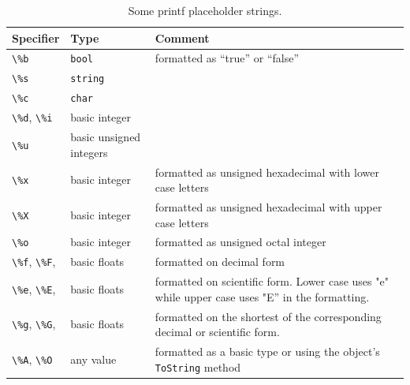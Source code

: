 \documentclass[fsharpnotes.tex]{subfiles}
\begin{document}
\begin{table}[H]
  \centering
  \begin{tabularx}{\linewidth}{|l|l|X|}
    \hline
    \rowcolor{headerRowColor} Specifier& Type&Comment\\
    \hline
    \lstinline!\%b!&\lstinline!bool!&formatted as ``true'' or ``false''\\
    \hline
    \lstinline!\%s!&\lstinline!string!&\\
    \hline
    \lstinline!\%c!&\lstinline!char!&\\
    \hline
    \mbox{\lstinline!\%d!,} \mbox{\lstinline!\%i!}&basic integer&\\
    \hline
    \lstinline!\%u!&basic unsigned integers&\\
    \hline
    \lstinline!\%x!&basic integer&formatted as unsigned hexadecimal with lower case letters\\
    \hline
    \lstinline!\%X!&basic integer&formatted as unsigned hexadecimal with upper case letters\\
    \hline
    \lstinline!\%o!&basic integer&formatted as unsigned octal integer\\
    \hline
    \mbox{\lstinline!\%f!,} \mbox{\lstinline!\%F!,} &basic floats&formatted on decimal form\\
    \hline
    \mbox{\lstinline!\%e!,} \mbox{\lstinline!\%E!,} &basic floats&formatted on scientific form. Lower case uses "e" while upper case uses "E'' in the formatting.\\
    \hline
    \mbox{\lstinline!\%g!,} \mbox{\lstinline!\%G!,} &basic floats&formatted on the shortest of the corresponding decimal or scientific form.\\
    \hline
    \lstinline!\%A!, \lstinline!\%O!&any value&formatted as a basic type or using the object's \lstinline!ToString! method\\
    \hline
  \end{tabularx}
  \caption{Some printf placeholder strings.}
  \label{tab:printfPlaceholder}
\end{table}
\end{document}

